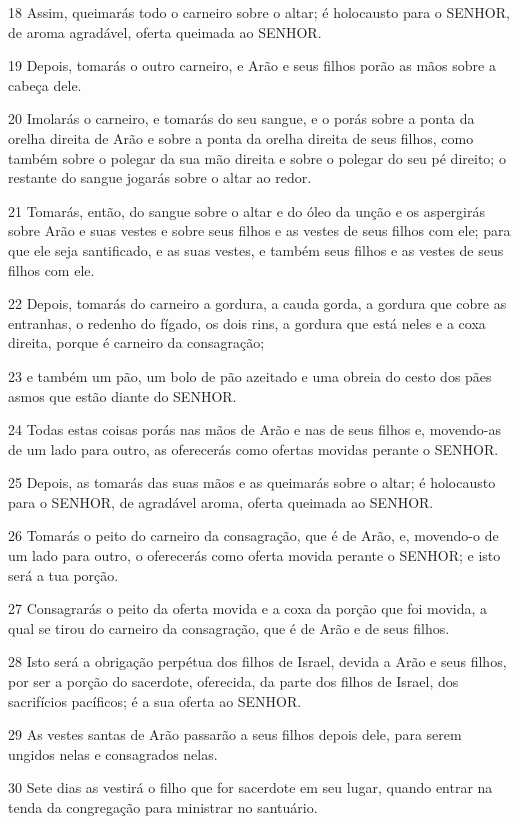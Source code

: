 \par 18 Assim, queimarás todo o carneiro sobre o altar; é holocausto para o SENHOR, de aroma agradável, oferta queimada ao SENHOR.
\par 19 Depois, tomarás o outro carneiro, e Arão e seus filhos porão as mãos sobre a cabeça dele.
\par 20 Imolarás o carneiro, e tomarás do seu sangue, e o porás sobre a ponta da orelha direita de Arão e sobre a ponta da orelha direita de seus filhos, como também sobre o polegar da sua mão direita e sobre o polegar do seu pé direito; o restante do sangue jogarás sobre o altar ao redor.
\par 21 Tomarás, então, do sangue sobre o altar e do óleo da unção e os aspergirás sobre Arão e suas vestes e sobre seus filhos e as vestes de seus filhos com ele; para que ele seja santificado, e as suas vestes, e também seus filhos e as vestes de seus filhos com ele.
\par 22 Depois, tomarás do carneiro a gordura, a cauda gorda, a gordura que cobre as entranhas, o redenho do fígado, os dois rins, a gordura que está neles e a coxa direita, porque é carneiro da consagração;
\par 23 e também um pão, um bolo de pão azeitado e uma obreia do cesto dos pães asmos que estão diante do SENHOR.
\par 24 Todas estas coisas porás nas mãos de Arão e nas de seus filhos e, movendo-as de um lado para outro, as oferecerás como ofertas movidas perante o SENHOR.
\par 25 Depois, as tomarás das suas mãos e as queimarás sobre o altar; é holocausto para o SENHOR, de agradável aroma, oferta queimada ao SENHOR.
\par 26 Tomarás o peito do carneiro da consagração, que é de Arão, e, movendo-o de um lado para outro, o oferecerás como oferta movida perante o SENHOR; e isto será a tua porção.
\par 27 Consagrarás o peito da oferta movida e a coxa da porção que foi movida, a qual se tirou do carneiro da consagração, que é de Arão e de seus filhos.
\par 28 Isto será a obrigação perpétua dos filhos de Israel, devida a Arão e seus filhos, por ser a porção do sacerdote, oferecida, da parte dos filhos de Israel, dos sacrifícios pacíficos; é a sua oferta ao SENHOR.
\par 29 As vestes santas de Arão passarão a seus filhos depois dele, para serem ungidos nelas e consagrados nelas.
\par 30 Sete dias as vestirá o filho que for sacerdote em seu lugar, quando entrar na tenda da congregação para ministrar no santuário.
